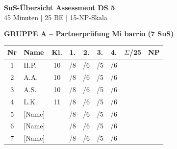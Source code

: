 \documentclass[11pt, a4paper]{article}
\begin{document}
\vspace{1cm}

\begin{center}
\end{center}

\newpage


\begin{center}
{\Large\bfseries SuS-Übersicht Assessment DS 5}\\[0.3cm]
{\small 45 Minuten | 25 BE | 15-NP-Skala}
\end{center}

\vspace{0.5cm}

\textbf{\textcolor{gruppeA}{GRUPPE A -- Partnerprüfung \glqq Mi barrio\grqq} (7 SuS)}

\vspace{0.3cm}

\begin{tabular}{|c|l|c|c|c|c|c|c|c|}
\hline
\rowcolor{gruppeA!20}
\textbf{Nr} & \textbf{Name} & \textbf{Kl.} & \textbf{1.} & \textbf{2.} & \textbf{3.} & \textbf{4.} & \textbf{$\Sigma$/25} & \textbf{NP} \\
\hline
1 & H.P. & 10 & /8 & /6 & /5 & /6 & & \\
\hline
2 & A.A. & 10 & /8 & /6 & /5 & /6 & & \\
\hline
3 & A.S. & 10 & /8 & /6 & /5 & /6 & & \\
\hline
4 & L.K. & 11 & /8 & /6 & /5 & /6 & & \\
\hline
5 & [Name] & & /8 & /6 & /5 & /6 & & \\
\hline
6 & [Name] & & /8 & /6 & /5 & /6 & & \\
\hline
7 & [Name] & & /8 & /6 & /5 & /6 & & \\
\hline
\end{tabular}
\end{document}
